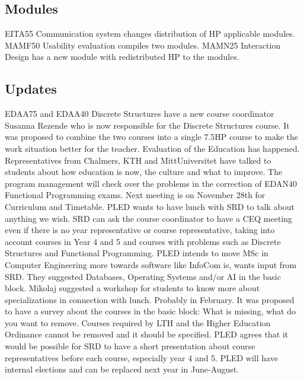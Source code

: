 \documentclass{article}
\begin{document}
	\subsection{Modules}
	EITA55 Communication system changes distribution of HP applicable modules.\newline
	MAMF50 Usability evaluation compiles two modules.\newline
	MAMN25 Interaction Design has a new module with redistributed HP to the modules.
	
	\subsection{Updates}
	
	EDAA75 and EDAA40 Discrete Structures have a new course coordinator Susanna Rezende who is now responsible for the Discrete Structures course. It was proposed to combine the two courses into a single 7.5HP course to make the work situation better for the teacher.\newline
	Evaluation of the Education has happened. Representatives from Chalmers, KTH and MittUniversitet have talked to students about how education is now, the culture and what to improve.\newline
	The program management will check over the problems in the correction of EDAN40 Functional Programming exams.\newline
	Next meeting is on November 28th for Curriculum and Timetable.\newline
	PLED wants to have lunch with SRD to talk about anything we wish.\newline	
	SRD can ask the course coordinator to have a CEQ meeting even if there is no year representative or course representative, taking into account courses in Year 4 and 5 and courses with problems such as Discrete Structures and Functional Programming.\newline
	PLED intends to move MSc in Computer Engineering more towards software like InfoCom is, wants input from SRD. They suggested Databases, Operating Systems and/or AI in the basic block.
	Mikolaj suggested a workshop for students to know more about specializations in connection with lunch. Probably in February.\newline
	It was proposed to have a survey about the courses in the basic block: What is missing, what do you want to remove. Courses required by LTH and the Higher Education Ordinance cannot be removed and it should be specified.\newline
	PLED agrees that it would be possible for SRD to have a short presentation about course representatives before each course, especially year 4 and 5.
	PLED will have internal elections and can be replaced next year in June-August.
	
	
\end{document}

